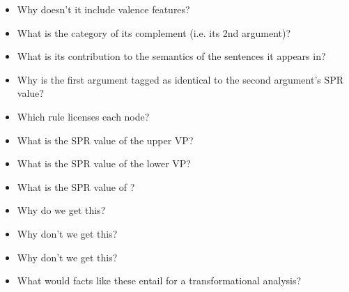 \documentclass[a4paper,landscape,headrule,footrule]{foils}
\begin{document}
\begin{itemize}\addtolength{\itemsep}{-1ex}
\item Why doesn’t it include valence features?
\item What is the category of its complement (i.e. its 2nd argument)?
\item What is its contribution to the semantics of the sentences it 
appears in?
\item Why is the first argument tagged as identical to the second 
argument’s SPR value?
\end{itemize}

\begin{tree}
\end{tree}

\begin{itemize}
\item Which rule licenses each node?
\item What is the SPR value of the upper VP?
\item What is the SPR value of the  lower VP?
\item What is the SPR value of ?
\end{itemize}

\begin{itemize}
\item Why do we get this?
  \begin{exe}
    \ex {}
  \end{exe}
\item Why don't we get this?
 \begin{exe}
    \ex *
  \end{exe}
\item Why don’t we get this? 
\begin{exe}
    \ex *
  \end{exe}
\item What would facts like these entail for a transformational 
analysis?
\end{itemize}

\end{document}
